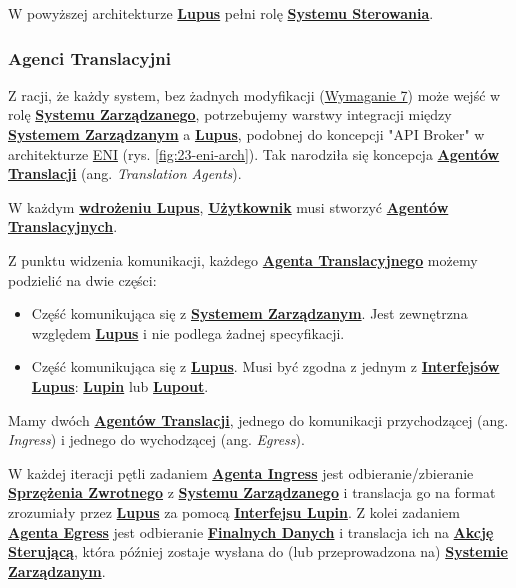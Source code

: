 W powyższej architekturze \hyperlink{def:lupus}{\textbf{Lupus}} pełni rolę \hyperlink{def:system-sterowania}{\textbf{Systemu Sterowania}}.


\subsubsection{Agenci Translacyjni}
Z racji, że każdy system, bez żadnych modyfikacji (\hyperref[req:7]{Wymaganie 7}) może wejść w rolę \hyperlink{def:system-zarzadzany}{\textbf{Systemu Zarządzanego}}, potrzebujemy warstwy integracji między \hyperlink{def:system-zarzadzany}{\textbf{Systemem Zarządzanym}} a \hyperlink{def:lupus}{\textbf{Lupus}}, podobnej do koncepcji "API Broker" w architekturze \hyperlink{def:eni}{ENI} (rys. \ref{fig:23-eni-arch}). Tak narodziła się koncepcja \hyperlink{def:agent-translacji}{\textbf{Agentów Translacji}} (ang. \textit{Translation Agents}). 

W każdym \hyperlink{def:wdrozenie-lupus}{\textbf{wdrożeniu Lupus}}, \hyperlink{def:uzytkownik}{\textbf{Użytkownik}} musi stworzyć \hyperlink{def:agent-translacji}{\textbf{Agentów Translacyjnych}}. 

Z punktu widzenia komunikacji, każdego \hyperlink{def:agent-translacji}{\textbf{Agenta Translacyjnego}} możemy podzielić na dwie części:
\begin{itemize}
    \item Część komunikująca się z \hyperlink{def:system-zarzadzany}{\textbf{Systemem Zarządzanym}}. Jest zewnętrzna względem \hyperlink{def:lupus}{\textbf{Lupus}} i nie podlega żadnej specyfikacji.
    \item Część komunikująca się z \hyperlink{def:lupus}{\textbf{Lupus}}. Musi być zgodna z jednym z \hyperlink{def:interfejsy-lupus}{\textbf{Interfejsów Lupus}}: \hyperlink{def:interfejs-lupin}{\textbf{Lupin}} lub \hyperlink{def:interfejs-lupout}{\textbf{Lupout}}.
\end{itemize}

Mamy dwóch \hyperlink{def:agent-translacji}{\textbf{Agentów Translacji}}, jednego do komunikacji przychodzącej (ang. \textit{Ingress}) i jednego do wychodzącej (ang. \textit{Egress}). 

W każdej iteracji pętli zadaniem \hyperlink{def:agent-ingress}{\textbf{Agenta Ingress}} jest odbieranie/zbieranie \hyperlink{def:sprzezenie-zwrotne}{\textbf{Sprzężenia Zwrotnego}} z \hyperlink{def:system-zarzadzany}{\textbf{Systemu Zarządzanego}} i translacja go na format zrozumiały przez \hyperlink{def:lupus}{\textbf{Lupus}} za pomocą \hyperlink{def:interfejs-lupin}{\textbf{Interfejsu Lupin}}. Z kolei zadaniem \hyperlink{def:agent-egress}{\textbf{Agenta Egress}} jest odbieranie \hyperlink{def:finalne-dane}{\textbf{Finalnych Danych}} i translacja ich na \hyperlink{def:akcja-sterujaca}{\textbf{Akcję Sterującą}}, która później zostaje wysłana do (lub przeprowadzona na) \hyperlink{def:system-zarzadzany}{\textbf{Systemie Zarządzanym}}.

